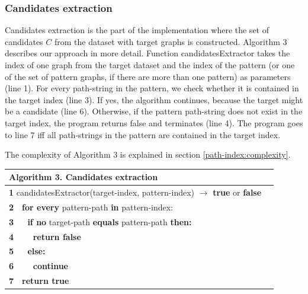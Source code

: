 \documentclass{l4proj}
\theoremstyle{definition}
\begin{document}
\subsubsection{Candidates extraction}
\label{path-index:candidates-extraction}
Candidates extraction is the part of the implementation where the set of candidates $C$ from the dataset with target graphs is constructed. Algorithm 3 describes our approach in more detail. Function \textrm{candidatesExtractor} takes the index of one graph from the target dataset and the index of the pattern (or one of the set of pattern graphs, if there are more than one pattern) as parameters (line 1). For every path-string in the pattern, we check whether it is contained in the target index (line 3). If yes, the algorithm continues, because the target might be a candidate (line 6). Otherwise, if the pattern path-string does not exist in the target index, the program returns false and terminates (line 4). The program goes to line 7 iff all path-strings in the pattern are contained in the target index.\par
The complexity of Algorithm 3 is explained in section \ref{path-index:complexity}. 
\begin{table}[H]
 \centering
 \label{Algorithm 3.}
 \begin{tabular}{l l}
 \textbf{Algorithm 3.} Candidates extraction \\\hline
 \small\textbf{1} \small{candidatesExtractor(target-index, pattern-index) $\rightarrow$ \textbf{true} or \textbf{false}}\\
 \small\textbf{2} \,\,\,\,\small{\textbf{for every} pattern-path \textbf{in} pattern-index:}\\
 \small\textbf{3} \,\,\,\,\,\,\,\,\small{\textbf{if no} target-path \textbf{equals} pattern-path \textbf{then:}}\\
 \small\textbf{4} \,\,\,\,\,\,\,\,\,\,\,\,\small{\textbf{return false}}\\
 \small\textbf{5} \,\,\,\,\,\,\,\,\small{\textbf{else:}}\\
 \small\textbf{6} \,\,\,\,\,\,\,\,\,\,\,\,\small{\textbf{continue}}\\
 \small\textbf{7} \,\,\,\,\small{\textbf{return true}}\\
 \hline
 \end{tabular}
\end{table}
\end{document}
